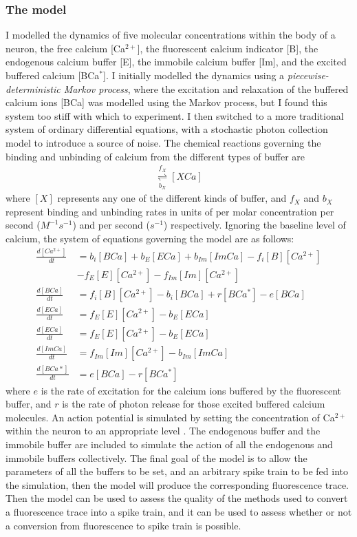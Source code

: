 \documentclass[a4paper,12pt]{article}
\theoremstyle{definition}
\newcommand{\diff}[2]{\frac{d #1}{d #2}}%
\begin{document}
\subsubsection{The model} 
 	 I modelled the dynamics of five molecular concentrations within the body of a neuron, the free calcium [Ca$^{2+}$], the fluorescent calcium indicator [B], the endogenous calcium buffer [E], the immobile calcium buffer [Im], and the excited buffered calcium [BCa$^*$]. I initially modelled the dynamics using a \textit{piecewise-deterministic Markov process}, where the excitation and relaxation of the buffered calcium ions [BCa] was modelled using the Markov process, but I found this system too stiff with which to experiment. I then switched to a more traditional system of ordinary differential equations, with a stochastic photon collection model to introduce a source of noise. The chemical reactions governing the binding and unbinding of calcium from the different types of buffer are
	\begin{align*}
	[X][Ca^{2+}] \underset{b_X}{\overset{f_X}{\rightleftharpoons}} [XCa]
	\end{align*}	 	 
	where $[X]$ represents any one of the different kinds of buffer, and $f_X$ and $b_X$ represent binding and unbinding rates in units of per molar concentration per second ($M^{-1}s^{-1}$) and per second ($s^{-1}$) respectively. Ignoring the baseline level of calcium, the system of equations governing the model are as follows:
	\begin{align*}
	\diff{[Ca^{2+}]}{t} &= b_i [BCa] + b_E [ECa] + b_{Im}[ImCa] - f_i [B][Ca^{2+}]  \\ 
						&- f_E [E][Ca^{2+}] - f_{Im}[Im][Ca^{2+}] \\ 
	\diff{[BCa]}{t} &= f_i [B][Ca^{2+}] - b_i [BCa] + r[BCa^*] - e[BCa] \\ 
	\diff{[ECa]}{t} &= f_E [E][Ca^{2+}] - b_E [ECa] \\ 
	\diff{[ECa]}{t} &= f_E [E][Ca^{2+}] - b_E [ECa] \\
	\diff{[ImCa]}{t} &= f_{Im} [Im][Ca^{2+}] - b_{Im} [ImCa] \\ 
	\diff{[BCa*]}{t} &= e[BCa] - r[BCa^*] 
	\end{align*}
	where $e$ is the rate of excitation for the calcium ions buffered by the fluorescent buffer, and $r$ is the rate of photon release for those excited buffered calcium molecules. An action potential is simulated by setting the concentration of Ca$^{2+}$ within the neuron to an appropriate level \cite{maravall}.	The endogenous buffer and the immobile buffer are included to simulate the action of all the endogenous and immobile buffers collectively. The final goal of the model is to allow the parameters of all the buffers to be set, and an arbitrary spike train to be fed into the simulation, then the model will produce the corresponding fluorescence trace. Then the model can be used to assess the quality of the methods used to convert a fluorescence trace into a spike train, and it can be used to assess whether or not a conversion from fluorescence to spike train is possible.
\end{document}
